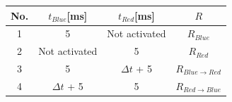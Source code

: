{{{       \begin{table}[H]
         \begin{center}
           \begin{tabular}[H]{|c||c|c||c|} \hline
             No. & $t_{Blue}$[ms] & $t_{Red}$[ms] & $R$ \\ \hline \hline
             1 & 5 & Not activated & $R_{Blue}$\\ \hline
             2 & Not activated & 5 & $R_{Red}$\\ \hline
             3 & 5 & ${\Delta}t$ + 5 & $R_{Blue \to Red}$\\ \hline
             4 & ${\Delta}t$ + 5 & 5 & $R_{Red \to Blue}$\\ \hline
           \end{tabular}
         \end{center}
       \end{table}

}}}
